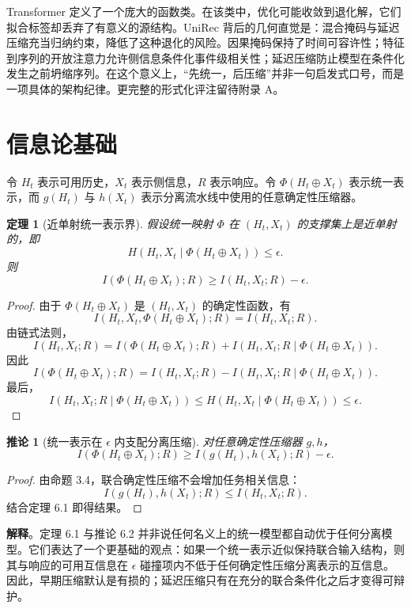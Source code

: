\documentclass{article}
\newtheorem{theorem}{定理}
\newtheorem{corollary}{推论}
\begin{document}
Transformer 定义了一个庞大的函数类。在该类中，优化可能收敛到退化解，它们拟合标签却丢弃了有意义的源结构。UniRec 背后的几何直觉是：混合掩码与延迟压缩充当归纳约束，降低了这种退化的风险。因果掩码保持了时间可容许性；特征到序列的开放注意力允许侧信息条件化事件级相关性；延迟压缩防止模型在条件化发生之前坍缩序列。在这个意义上，“先统一，后压缩”并非一句启发式口号，而是一项具体的架构纪律。更完整的形式化评注留待附录 A。

\section{信息论基础}

令 \(H_t\) 表示可用历史，\(X_t\) 表示侧信息，\(R\) 表示响应。令 \(\Phi(H_t \oplus X_t)\) 表示统一表示，而 \(g(H_t)\) 与 \(h(X_t)\) 表示分离流水线中使用的任意确定性压缩器。

\begin{theorem}[近单射统一表示界]
假设统一映射 \(\Phi\) 在 \((H_t,X_t)\) 的支撑集上是近单射的，即
\[
H(H_t,X_t \mid \Phi(H_t \oplus X_t)) \le \epsilon.
\]
则
\[
I(\Phi(H_t \oplus X_t); R) \ge I(H_t,X_t; R) - \epsilon. \tag{6.1}
\]
\end{theorem}
\begin{proof}
由于 \(\Phi(H_t \oplus X_t)\) 是 \((H_t,X_t)\) 的确定性函数，有
\[
I(H_t,X_t,\Phi(H_t \oplus X_t); R) = I(H_t,X_t; R).
\]
由链式法则，
\[
I(H_t,X_t; R) = I(\Phi(H_t \oplus X_t); R) + I(H_t,X_t; R \mid \Phi(H_t \oplus X_t)).
\]
因此
\[
I(\Phi(H_t \oplus X_t); R) = I(H_t,X_t; R) - I(H_t,X_t; R \mid \Phi(H_t \oplus X_t)).
\]
最后，
\[
I(H_t,X_t; R \mid \Phi(H_t \oplus X_t)) \le H(H_t,X_t \mid \Phi(H_t \oplus X_t)) \le \epsilon.
\]
\end{proof}

\begin{corollary}[统一表示在 \(\epsilon\) 内支配分离压缩]
对任意确定性压缩器 \(g,h\)，
\[
I(\Phi(H_t \oplus X_t); R) \ge I(g(H_t),h(X_t); R) - \epsilon. \tag{6.2}
\]
\end{corollary}
\begin{proof}
由命题 3.4，联合确定性压缩不会增加任务相关信息：
\[
I(g(H_t),h(X_t); R) \le I(H_t,X_t; R).
\]
结合定理 6.1 即得结果。
\end{proof}

\textbf{解释}。定理 6.1 与推论 6.2 并非说任何名义上的统一模型都自动优于任何分离模型。它们表达了一个更基础的观点：如果一个统一表示近似保持联合输入结构，则其与响应的可用互信息在 \(\epsilon\) 碰撞项内不低于任何确定性压缩分离表示的互信息。因此，早期压缩默认是有损的；延迟压缩只有在充分的联合条件化之后才变得可辩护。
\end{document}
